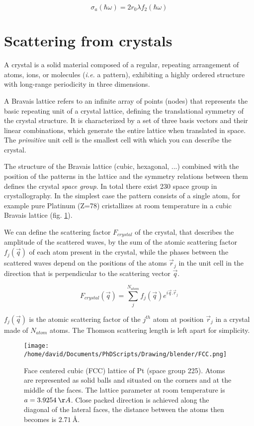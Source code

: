 \begin{equation}
    \label{eq:AbsorptionCrossSection}
    \sigma_a(\hbar\omega) = 2 r_0 \lambda f_2(\hbar\omega)
\end{equation}

\section{Scattering from crystals}

A crystal is a solid material composed of a regular, repeating arrangement of atoms, ions, or molecules (\textit{i.e.} a pattern), exhibiting a highly ordered structure with long-range periodicity in three dimensions.

A Bravais lattice refers to an infinite array of points (nodes) that represents the basic repeating unit of a crystal lattice, defining the translational symmetry of the crystal structure.
It is characterized by a set of three basis vectors and their linear combinations, which generate the entire lattice when translated in space.
The \textit{primitive} unit cell is the smallest cell with which you can describe the crystal.

The structure of the Bravais lattice (cubic, hexagonal, ...) combined with the position of the patterns in the lattice and the symmetry relations between them defines the crystal \textit{space group}.
In total there exist 230 space group in crystallography.
In the simplest case the pattern consists of a single atom, for example pure Platinum (Z=78) cristallizes at room temperature in a cubic Bravais lattice (fig. \ref{fig:fcc}).

We can define the scattering factor $F_{crystal}$ of the crystal, that describes the amplitude of the scattered waves, by the sum of the atomic scattering factor $f_j(\vec{q})$ of each atom present in the crystal, while the phases between the scattered waves depend on the positions of the atoms $\vec{r}_j$ in the unit cell in the direction that is perpendicular to the scattering vector $\vec{q}$.

\begin{equation}
    F_{crystal}(\vec{q}) = \sum_j^{N_{atom}} f_j(\vec{q}) e^{i\vec{q}.\vec{r}_j}
\end{equation}

$f_j(\vec{q})$ is the atomic scattering factor of the $j^{th}$ atom at position $\vec{r}_j$ in a crystal made of $N_{atom}$ atoms.
The Thomson scattering length is left apart for simplicity.

\begin{figure}[!htb]
    \centering
    \texttt{[image: /home/david/Documents/PhDScripts/Drawing/blender/FCC.png]}
    \caption{Face centered cubic (FCC) lattice of Pt (space group 225). Atoms are represented as solid balls and situated on the corners and at the middle of the faces. The lattice parameter at room temperature is $a = 3.9254 \:\AA$. Close packed direction is achieved along the diagonal of the lateral faces, the distance between the atoms then becomes is $2.71 \:\si{\angstrom}.$}
    \label{fig:fcc}
\end{figure}

